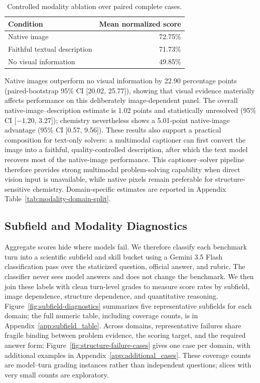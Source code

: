 \documentclass[11pt]{article}
\begin{document}
\begin{table}[t]
\centering
\small
\setlength{\tabcolsep}{5pt}
\begin{tabular}{l r}
\toprule
\textbf{Condition} & \textbf{Mean normalized score} \\
\midrule
Native image & 72.75\% \\
Faithful textual description & 71.73\% \\
No visual information & 49.85\% \\
\bottomrule
\end{tabular}
\caption{Controlled modality ablation over paired complete cases.}
\label{tab:controlled-modality-ablation}
\vspace{-0.3cm}
\end{table}

Native images outperform no visual information by 22.90 percentage points (paired-bootstrap 95\% CI [20.02, 25.77]), showing that visual evidence materially affects performance on this deliberately image-dependent panel.
The overall native-image--description estimate is 1.02 points and statistically unresolved (95\% CI [$-1.20$, 3.27]); chemistry nevertheless shows a 5.01-point native-image advantage (95\% CI [0.57, 9.56]).
These results also support a practical composition for text-only solvers: a multimodal captioner can first convert the image into a faithful, quality-controlled description, after which the text model recovers most of the native-image performance. This captioner--solver pipeline therefore provides strong multimodal problem-solving capability when direct vision input is unavailable, while native pixels remain preferable for structure-sensitive chemistry.
Domain-specific estimates are reported in Appendix Table~\ref{tab:modality-domain-split}.

\subsection{Subfield and Modality Diagnostics}
Aggregate scores hide where models fail.
We therefore classify each benchmark turn into a scientific subfield and skill bucket using a Gemini 3.5 Flash classification pass over the staticized question, official answer, and rubric.
The classifier never sees model answers and does not change the benchmark.
We then join these labels with clean turn-level grades to measure score rates by subfield, image dependence, structure dependence, and quantitative reasoning.
Figure~\ref{fig:subfield-diagnostics} summarizes five representative subfields for each domain; the full numeric table, including coverage counts, is in Appendix~\ref{app:subfield_table}.
Across domains, representative failures share fragile binding between problem evidence, the scoring target, and the required answer form; Figure~\ref{fig:structure-failure-cases} gives one case per domain, with additional examples in Appendix~\ref{app:additional_cases}.
These coverage counts are model--turn grading instances rather than independent questions; slices with very small counts are exploratory.
\end{document}
